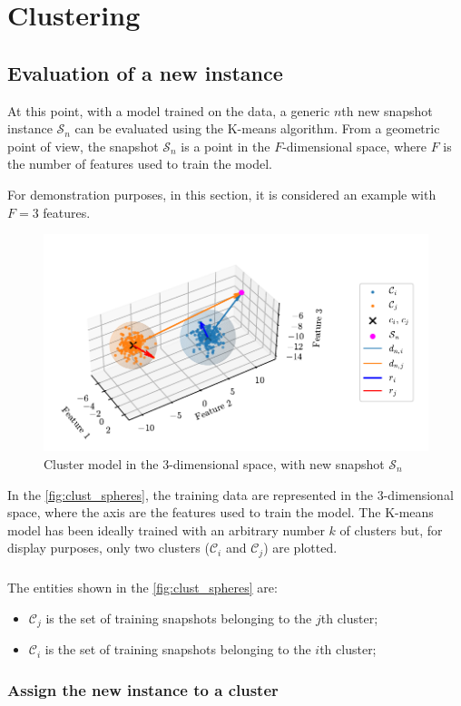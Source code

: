 \chapter{Clustering}

\section{Evaluation of a new instance}

At this point, with a model trained on the data, a generic $n$th new snapshot instance $\mathcal{S}_n$ can be evaluated using the K-means algorithm.
From a geometric point of view, the snapshot $\mathcal{S}_n$ is a point in the $F$-dimensional space, where $F$ is the number of features used to train the model.

For demonstration purposes, in this section, it is considered an example with $F=3$ features.

\begin{figure}[htbp]
  \centering
  \includegraphics[width=\textwidth]{images/Spheres_2.pdf}
\caption{Cluster model in the $3$-dimensional space, with new snapshot $\mathcal{S}_n$}
\label{fig:clust_spheres}
\end{figure}

In the \autoref{fig:clust_spheres}, the training data are represented in the $3$-dimensional space, where the axis are the features used to train the model. The K-means model has been ideally trained with an arbitrary number $k$ of clusters but, for display purposes, only two clusters  ($\mathcal{C}_i$ and $\mathcal{C}_j$) are plotted. 
\paragraph*{}
The entities shown in the \autoref{fig:clust_spheres} are:
\begin{itemize}
  \item $\mathcal{C}_j$ is the set of training snapshots belonging to the $j$th cluster;
  \item $\mathcal{C}_i$ is the set of training snapshots belonging to the $i$th cluster;
\end{itemize}

\subsection{Assign the new instance to a cluster}

